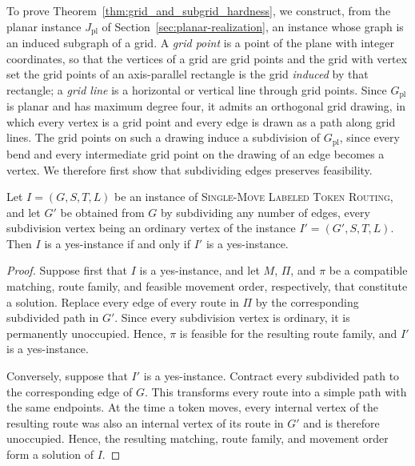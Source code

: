 \documentclass[a4paper,USenglish,thm-restate]{lipics-v2021}
\theoremstyle{problemstyle}
\begin{document}
To prove Theorem~\ref{thm:grid_and_subgrid_hardness}, we construct, from
the planar instance $J_{\mathrm{pl}}$ of
Section~\ref{sec:planar-realization}, an instance whose graph is an
induced subgraph of a grid. A \emph{grid point} is a point of the plane
with integer coordinates, so that the vertices of a grid are grid points
and the grid with vertex set the grid points of an axis-parallel
rectangle is the grid \emph{induced} by that rectangle; a \emph{grid line}
is a horizontal or vertical line through grid points. Since
$G_{\mathrm{pl}}$ is planar and has maximum degree four, it admits an
orthogonal grid drawing, in which every vertex is a grid point and every
edge is drawn as a path along grid lines. The grid points on such a
drawing induce a subdivision of $G_{\mathrm{pl}}$, since every bend and
every intermediate grid point on the drawing of an edge becomes a vertex.
We therefore first show that subdividing edges preserves feasibility.

\begin{observation}\label{obs:edge-subdivision}
Let $I=(G,S,T,L)$ be an instance of \textsc{Single-Move Labeled Token
Routing}, and let $G'$ be obtained from $G$ by subdividing any number of
edges, every subdivision vertex being an ordinary vertex of the instance
$I'=(G',S,T,L)$. Then $I$ is a yes-instance if and only if $I'$ is a
yes-instance.
\end{observation}

\begin{proof}
Suppose first that $I$ is a yes-instance, and let $M$, $\Pi$, and $\pi$ be a compatible matching, route family, and feasible movement order, respectively, that constitute a solution. Replace every edge of every route in $\Pi$ by the corresponding subdivided path in $G'$. Since every subdivision vertex is ordinary, it is permanently unoccupied. Hence, $\pi$ is feasible for the resulting route family, and $I'$ is a yes-instance.

Conversely, suppose that $I'$ is a yes-instance. Contract every subdivided path to the corresponding edge of $G$. This transforms every route into a simple path with the same endpoints. At the time a token moves, every internal vertex of the resulting route was also an internal vertex of its route in $G'$ and is therefore unoccupied. Hence, the resulting matching, route family, and movement order form a solution of $I$.
\end{proof}

\gridAndSubgridHardness*
\end{document}
